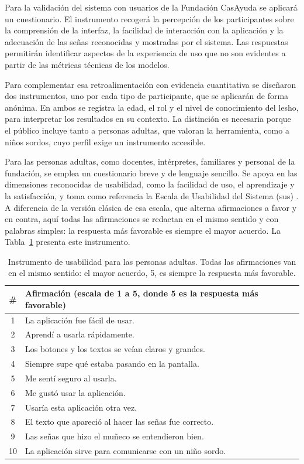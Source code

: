 Para la validación del sistema con usuarios de la Fundación CasAyuda se
aplicará un cuestionario. El instrumento recogerá la percepción de los participantes
sobre la comprensión de la interfaz, la facilidad de interacción con la aplicación y la
adecuación de las señas reconocidas y mostradas por el sistema. Las respuestas
permitirán identificar aspectos de la experiencia de uso que no son evidentes a partir
de las métricas técnicas de los modelos.

Para complementar esa retroalimentación con evidencia cuantitativa se diseñaron dos instrumentos, uno por cada tipo de participante, que se aplicarán de forma anónima. En ambos se registra la edad, el rol y el nivel de conocimiento del \Acrshort{lesho}, para interpretar los resultados en su contexto. La distinción es necesaria porque el público incluye tanto a personas adultas, que valoran la herramienta, como a niños sordos, cuyo perfil exige un instrumento accesible.

Para las personas adultas, como docentes, intérpretes, familiares y personal de la fundación, se emplea un cuestionario breve y de lenguaje sencillo. Se apoya en las dimensiones reconocidas de usabilidad, como la facilidad de uso, el aprendizaje y la satisfacción, y toma como referencia la Escala de Usabilidad del Sistema (\acrshort{sus}) \cite{brooke_sus_1996}. A diferencia de la versión clásica de esa escala, que alterna afirmaciones a favor y en contra, aquí todas las afirmaciones se redactan en el mismo sentido y con palabras simples: la respuesta más favorable es siempre el mayor acuerdo. La Tabla~\ref{tab:instrumento} presenta este instrumento.

\begin{table}[h!]
\centering
\begin{tabular}{cl}
\hline
\textbf{\#} & \textbf{Afirmación (escala de 1 a 5, donde 5 es la respuesta más favorable)} \\
\hline
1 & La aplicación fue fácil de usar. \\
2 & Aprendí a usarla rápidamente. \\
3 & Los botones y los textos se veían claros y grandes. \\
4 & Siempre supe qué estaba pasando en la pantalla. \\
5 & Me sentí seguro al usarla. \\
6 & Me gustó usar la aplicación. \\
7 & Usaría esta aplicación otra vez. \\
8 & El texto que apareció al hacer las señas fue correcto. \\
9 & Las señas que hizo el muñeco se entendieron bien. \\
10 & La aplicación sirve para comunicarse con un niño sordo. \\
\hline
\end{tabular}
\caption{Instrumento de usabilidad para las personas adultas. Todas las afirmaciones van en el mismo sentido: el mayor acuerdo, 5, es siempre la respuesta más favorable.}
\label{tab:instrumento}
\end{table}

